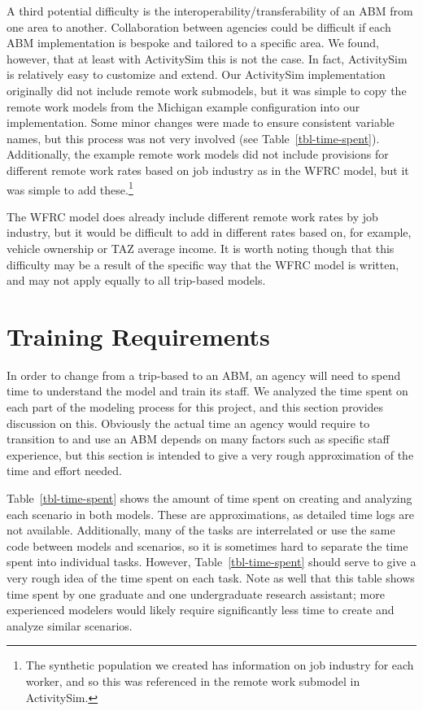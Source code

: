 \documentclass[fancy, oneside, mastersfancy, ms]{byuthesis}
\begin{document}
A third potential difficulty is the interoperability/transferability of
an ABM from one area to another. Collaboration between agencies could be
difficult if each ABM implementation is bespoke and tailored to a
specific area. We found, however, that at least with ActivitySim this is
not the case. In fact, ActivitySim is relatively easy to customize and
extend. Our ActivitySim implementation originally did not include remote
work submodels, but it was simple to copy the remote work models from
the Michigan example configuration into our implementation. Some minor
changes were made to ensure consistent variable names, but this process
was not very involved (see Table~\ref{tbl-time-spent}). Additionally,
the example remote work models did not include provisions for different
remote work rates based on job industry as in the WFRC model, but it was
simple to add these.\footnote{The synthetic population we created has
  information on job industry for each worker, and so this was
  referenced in the remote work submodel in ActivitySim.}

The WFRC model does already include different remote work rates by job
industry, but it would be difficult to add in different rates based on,
for example, vehicle ownership or TAZ average income. It is worth noting
though that this difficulty may be a result of the specific way that the
WFRC model is written, and may not apply equally to all trip-based
models.

\section{Training Requirements}\label{training-requirements}

In order to change from a trip-based to an ABM, an agency will need to
spend time to understand the model and train its staff. We analyzed the
time spent on each part of the modeling process for this project, and
this section provides discussion on this. Obviously the actual time an
agency would require to transition to and use an ABM depends on many
factors such as specific staff experience, but this section is intended
to give a very rough approximation of the time and effort needed.

Table~\ref{tbl-time-spent} shows the amount of time spent on creating
and analyzing each scenario in both models. These are approximations, as
detailed time logs are not available. Additionally, many of the tasks
are interrelated or use the same code between models and scenarios, so
it is sometimes hard to separate the time spent into individual tasks.
However, Table~\ref{tbl-time-spent} should serve to give a very rough
idea of the time spent on each task. Note as well that this table shows
time spent by one graduate and one undergraduate research assistant;
more experienced modelers would likely require significantly less time
to create and analyze similar scenarios.
\end{document}
